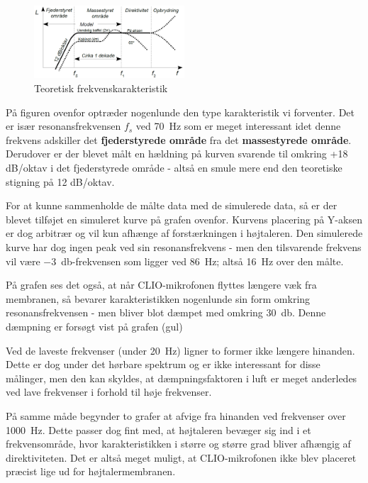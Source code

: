 \begin{figure} 
	\vspace{-20pt}
	\begin{center}
		\includegraphics[width=0.5\textwidth]{Billeder/FrekvenskarakteristikTeori}
	\end{center}
	\vspace{-15pt}
	\caption{Teoretisk frekvenskarakteristik}
	\vspace{-20pt}
\end{figure}
På figuren ovenfor optræder nogenlunde den type karakteristik vi forventer. Det er især resonansfrekvensen $f_s$ ved \SI{70}{\hertz} som er meget interessant idet denne frekvens adskiller det \textbf{fjederstyrede område} fra det \textbf{massestyrede område}. Derudover er der blevet målt en hældning på kurven svarende til omkring +18 dB/oktav i det fjederstyrede område - altså en smule mere end den teoretiske stigning på 12 dB/oktav.

\newpage
For at kunne sammenholde de målte data med de simulerede data, så er der blevet tilføjet en simuleret kurve på grafen ovenfor. Kurvens placering på Y-aksen er dog arbitrær og vil kun afhænge af forstærkningen i højtaleren. Den simulerede kurve har dog ingen peak ved sin resonansfrekvens -  men den tilsvarende frekvens vil være \SI{-3}{\decibel}-frekvensen som ligger ved \SI{86}{\hertz}; altså \SI{16}{\hertz} over den målte.

På grafen ses det også, at når CLIO-mikrofonen flyttes længere væk fra membranen, så bevarer karakteristikken nogenlunde sin form omkring resonansfrekvensen - men bliver blot dæmpet med omkring \SI{30}{\decibel}. Denne dæmpning er forsøgt vist på grafen (gul)

Ved de laveste frekvenser (under \SI{20}{\hertz}) ligner to former ikke længere hinanden. Dette er dog under det hørbare spektrum og er ikke interessant for disse målinger, men den kan skyldes, at dæmpningsfaktoren i luft er meget anderledes ved lave frekvenser i forhold til høje frekvenser.

På samme måde begynder to grafer at afvige fra hinanden ved frekvenser over \SI{1000}{\hertz}. Dette passer dog fint med, at højtaleren bevæger sig ind i et frekvensområde, hvor karakteristikken i større og større grad bliver afhængig af direktiviteten. Det er altså meget muligt, at CLIO-mikrofonen ikke blev placeret præcist lige ud for højtalermembranen.

